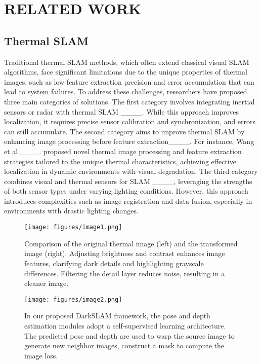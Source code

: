 \section{RELATED WORK}
\subsection{Thermal SLAM}
Traditional thermal SLAM methods, which often extend classical visual SLAM algorithms, face significant limitations due to the unique properties of thermal images, such as low feature extraction precision and error accumulation that can lead to system failures. To address these challenges, researchers have proposed three main categories of solutions.
The first category involves integrating inertial sensors or radar with thermal SLAM  ____. While this approach improves localization, it requires precise sensor calibration and synchronization, and errors can still accumulate.
The second category aims to improve thermal SLAM by enhancing image processing before feature extraction____. 
For instance, Wang et al____. proposed novel thermal image processing and feature extraction strategies tailored to the unique thermal characteristics, achieving effective localization in dynamic environments with visual degradation.
The third category combines visual and thermal sensors for SLAM  ____, leveraging the strengths of both sensor types under varying lighting conditions. However, this approach introduces complexities such as image registration and data fusion, especially in environments with drastic lighting changes.
\begin{figure}
    \centering
    \texttt{[image: figures/image1.png]}
    \caption{Comparison of the original thermal image (left) and the transformed image (right). Adjusting brightness and contrast enhances image features, clarifying dark details and highlighting grayscale differences. Filtering the detail layer reduces noise, resulting in a cleaner image.}
\label{fig:deeptio_arch_test2}
\end{figure}
\begin{figure*}
\centering
\texttt{[image: figures/image2.png]}
\caption{In our proposed DarkSLAM framework, the pose and depth estimation modules adopt a self-supervised learning architecture. The predicted pose
and depth are used to warp the source image to generate new neighbor images, construct a mask to compute the image loss. }
\label{fig:deeptio_arch_train3}
\end{figure*}


